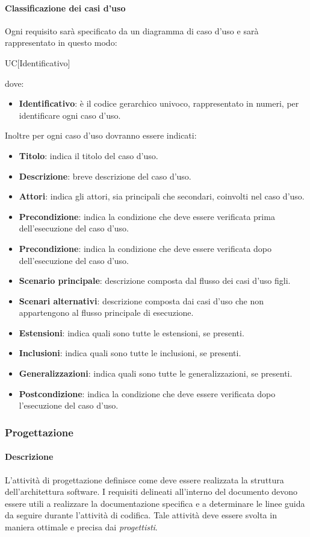 \paragraph{Classificazione dei casi d'uso}
Ogni requisito sarà specificato da un diagramma di caso d'uso e sarà rappresentato in questo modo:
\begin{center}
  UC[Identificativo]
\end{center}
dove:
\begin{itemize}
  \item\textbf{Identificativo}: è il codice gerarchico univoco, rappresentato in numeri, per identificare ogni caso d'uso.
\end{itemize}
Inoltre per ogni caso d'uso dovranno essere indicati:
\begin{itemize}
  \item\textbf{Titolo}: indica il titolo del caso d'uso.
  \item\textbf{Descrizione}: breve descrizione del caso d'uso.
  \item\textbf{Attori}: indica gli attori, sia principali che secondari, coinvolti nel caso d'uso.
  \item\textbf{Precondizione}: indica la condizione che deve essere verificata prima
  dell'esecuzione del caso d'uso.
   \item\textbf{Precondizione}: indica la condizione che deve essere verificata dopo dell'esecuzione del caso d'uso.
  \item\textbf{Scenario principale}: descrizione composta dal flusso dei casi d'uso
  figli.
  \item\textbf{Scenari alternativi}: descrizione composta dai casi d'uso che non
  appartengono al flusso principale di esecuzione.
  \item\textbf{Estensioni}: indica quali sono tutte le estensioni, se presenti.
  \item\textbf{Inclusioni}: indica quali sono tutte le inclusioni, se presenti.
  \item\textbf{Generalizzazioni}: indica quali sono tutte le generalizzazioni,
  se presenti.
  \item\textbf{Postcondizione}: indica la condizione che deve essere verificata dopo
  l'esecuzione del caso d'uso.
\end{itemize}

\subsubsection{Progettazione}
\paragraph{Descrizione}
L'attività di progettazione definisce come deve essere realizzata la struttura dell'architettura software. I requisiti delineati all'interno del documento \textit{\AdR} devono essere utili a realizzare la documentazione specifica e a determinare le linee guida da seguire durante l'attività di codifica.
Tale attività deve essere svolta in maniera ottimale e precisa dai \textit{progettisti}.

